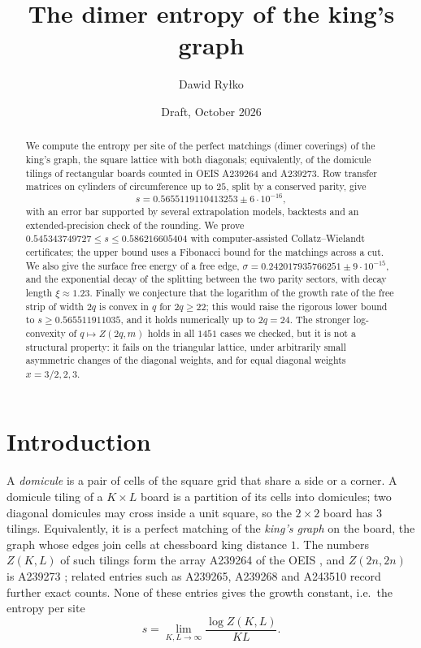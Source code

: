 \documentclass[11pt]{amsart}
\title{The dimer entropy of the king's graph}
\author{Dawid Ry\l{}ko}
\date{Draft, October 2026}
\theoremstyle{definition}
\theoremstyle{remark}
\begin{document}
\begin{abstract}
We compute the entropy per site of the perfect matchings (dimer coverings) of the king's
graph, the square lattice with both diagonals; equivalently, of the domicule tilings of
rectangular boards counted in OEIS A239264 and A239273. Row transfer matrices on cylinders of
circumference up to $25$, split by a conserved parity, give
\[
  s = 0.5655119110413253 \pm 6\cdot 10^{-16},
\]
with an error bar supported by several extrapolation models, backtests and an
extended-precision check of the rounding. We prove $0.545343749727 \le s \le 0.586216605404$
with computer-assisted Collatz--Wielandt certificates;
the upper bound uses a Fibonacci bound for the matchings across a cut. We also give the surface
free energy of a free edge, $\sigma = 0.242017935766251 \pm 9\cdot 10^{-15}$, and the
exponential decay of the splitting between the two parity sectors, with decay length
$\xi \approx 1.23$. Finally we conjecture that the logarithm of the growth rate of the free strip
of width $2q$ is convex in $q$ for $2q \ge 22$; this would raise the rigorous lower bound to
$s \ge 0.565511911035$, and it holds numerically up to $2q = 24$. The stronger log-convexity of
$q \mapsto Z(2q, m)$ holds in all $1451$ cases we checked, but it is not a structural property:
it fails on the triangular lattice, under arbitrarily small asymmetric changes of the diagonal
weights, and for equal diagonal weights $x = 3/2, 2, 3$.
\end{abstract}

\maketitle
\enlargethispage{2pt}

\section{Introduction}

A \emph{domicule} is a pair of cells of the square grid that share a side or a corner. A domicule
tiling of a $K \times L$ board is a partition of its cells into domicules; two diagonal domicules
may cross inside a unit square, so the $2\times 2$ board has $3$ tilings. Equivalently, it is a
perfect matching of the \emph{king's graph} on the board, the graph whose edges join cells at
chessboard king distance $1$. The numbers $Z(K, L)$ of such tilings form the array
A239264 of the OEIS \cite{oeisA239264}, and $Z(2n, 2n)$ is A239273 \cite{oeisA239273}; related
entries such as A239265, A239268 and A243510 \cite{oeisA239265,oeisA239268,oeisA243510} record
further exact counts. None of these entries gives the growth constant, i.e.\ the entropy per
site
\[
  s = \lim_{K, L \to \infty} \frac{\log Z(K, L)}{KL}.
\]
\end{document}
